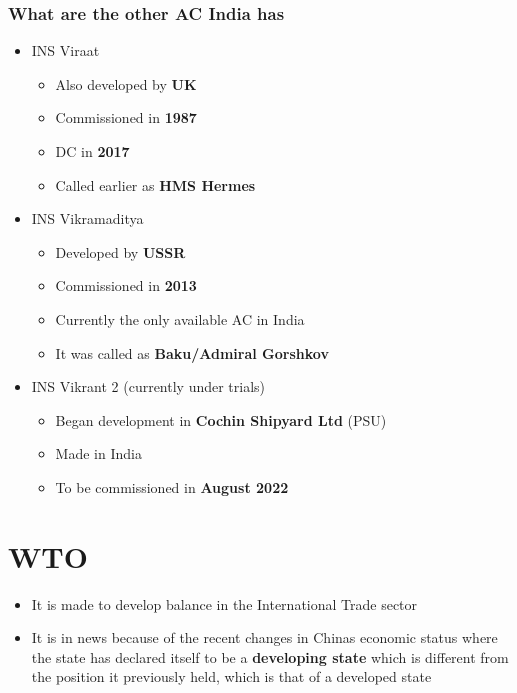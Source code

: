 \documentclass[11pt]{article}
\begin{document}
\subsubsection{What are the other AC India has}
\label{sec:orga83106c}
\begin{itemize}
\item INS Viraat
\begin{itemize}
\item Also developed by \textbf{UK}
\item Commissioned in \textbf{1987}
\item DC in \textbf{2017}
\item Called earlier as \textbf{HMS Hermes}
\end{itemize}

\item INS Vikramaditya
\begin{itemize}
\item Developed by \textbf{USSR}
\item Commissioned in \textbf{2013}
\item Currently the only available AC in India
\item It was called as \textbf{Baku/Admiral Gorshkov}
\end{itemize}

\item INS Vikrant 2 (currently under trials)
\begin{itemize}
\item Began development in \textbf{Cochin Shipyard Ltd} (PSU)
\item Made in India
\item To be commissioned in \textbf{August 2022}
\end{itemize}
\end{itemize}

\section{WTO}
\label{sec:org24f29b0}
\begin{itemize}
\item It is made to develop balance in the International Trade sector
\item It is in news because of the recent changes in Chinas economic status where the state has declared itself to be a \textbf{developing state} which is different from the position it previously held, which is that of a developed state
\end{itemize}
\end{document}
